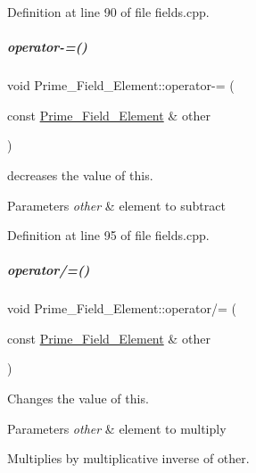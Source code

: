 Definition at line 90 of file fields.\+cpp.

\mbox{\label{group___fields_group_a19e1cde9dd774d554d8a1d5889a23344}} 
\subparagraph{\texorpdfstring{operator-\/=()}{operator-=()}}
{\footnotesize\ttfamily void Prime\+\_\+\+Field\+\_\+\+Element\+::operator-\/= (\begin{DoxyParamCaption}\item[{const \hyperlink{group___fields_group_class_prime___field___element}{Prime\+\_\+\+Field\+\_\+\+Element} \&}]{other }\end{DoxyParamCaption})}



decreases the value of {\ttfamily this}. 


\begin{DoxyParams}{Parameters}
{\em other} & element to subtract \\
\hline
\end{DoxyParams}


Definition at line 95 of file fields.\+cpp.

\mbox{\label{group___fields_group_a73d679e6a6f2f55ac8f2873cfb11f91b}} 
\subparagraph{\texorpdfstring{operator/=()}{operator/=()}}
{\footnotesize\ttfamily void Prime\+\_\+\+Field\+\_\+\+Element\+::operator/= (\begin{DoxyParamCaption}\item[{const \hyperlink{group___fields_group_class_prime___field___element}{Prime\+\_\+\+Field\+\_\+\+Element} \&}]{other }\end{DoxyParamCaption})}



Changes the value of {\ttfamily this}. 


\begin{DoxyParams}{Parameters}
{\em other} & element to multiply\\
\hline
\end{DoxyParams}
Multiplies by multiplicative inverse of {\ttfamily other}. 

